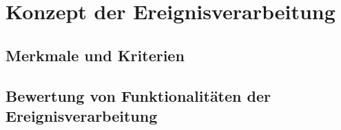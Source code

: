 \section{Konzept der Ereignisverarbeitung}

\subsection{Merkmale und Kriterien}

\subsection{Bewertung von Funktionalitäten der Ereignisverarbeitung}
